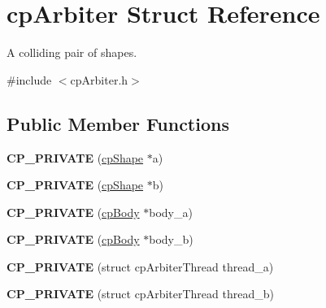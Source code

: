 \hypertarget{structcp_arbiter}{\section{cp\-Arbiter Struct Reference}
\label{structcp_arbiter}
}


A colliding pair of shapes.  




{\ttfamily \#include $<$cp\-Arbiter.\-h$>$}

\subsection*{Public Member Functions}
\begin{DoxyCompactItemize}
\item 
\hypertarget{structcp_arbiter_ab7aab9641da3ba0a84ac3ab3e3da6f88}{{\bfseries C\-P\-\_\-\-P\-R\-I\-V\-A\-T\-E} (\hyperlink{structcp_shape}{cp\-Shape} $\ast$a)}\label{structcp_arbiter_ab7aab9641da3ba0a84ac3ab3e3da6f88}

\item 
\hypertarget{structcp_arbiter_a1c9ed3823d25d2be4210252c09c6d6ed}{{\bfseries C\-P\-\_\-\-P\-R\-I\-V\-A\-T\-E} (\hyperlink{structcp_shape}{cp\-Shape} $\ast$b)}\label{structcp_arbiter_a1c9ed3823d25d2be4210252c09c6d6ed}

\item 
\hypertarget{structcp_arbiter_a0f24102bf529eaf7f6a3fe4ea264d347}{{\bfseries C\-P\-\_\-\-P\-R\-I\-V\-A\-T\-E} (\hyperlink{structcp_body}{cp\-Body} $\ast$body\-\_\-a)}\label{structcp_arbiter_a0f24102bf529eaf7f6a3fe4ea264d347}

\item 
\hypertarget{structcp_arbiter_ac1a6afe95bd5e60dc52f0dc043aa9d25}{{\bfseries C\-P\-\_\-\-P\-R\-I\-V\-A\-T\-E} (\hyperlink{structcp_body}{cp\-Body} $\ast$body\-\_\-b)}\label{structcp_arbiter_ac1a6afe95bd5e60dc52f0dc043aa9d25}

\item 
\hypertarget{structcp_arbiter_ad9fad4ee5aacf735c4abc9f9983194e3}{{\bfseries C\-P\-\_\-\-P\-R\-I\-V\-A\-T\-E} (struct cp\-Arbiter\-Thread thread\-\_\-a)}\label{structcp_arbiter_ad9fad4ee5aacf735c4abc9f9983194e3}

\item 
\hypertarget{structcp_arbiter_a9f482429227225329347fec51a8abe8b}{{\bfseries C\-P\-\_\-\-P\-R\-I\-V\-A\-T\-E} (struct cp\-Arbiter\-Thread thread\-\_\-b)}\label{structcp_arbiter_a9f482429227225329347fec51a8abe8b}


\end{DoxyCompactItemize}
